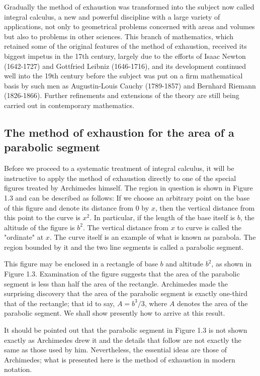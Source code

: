 \documentclass[cn,11pt,chinese]{elegantbook}
\numberwithin{equation}{section}
\begin{document}
Gradually the method of exhaustion was transformed into the subject now called integral calculus, a new and powerful discipline with a large variety of applications, not only to geometrical problems concerned with areas and volumes but also to problems in other sciences. This branch of mathematics, which retained some of the original features of the method of exhaustion, received its biggest impetus in the 17th century, largely due to the efforts of Isaac Newton (1642-1727) and Gottfried Leibniz (1646-1716), and its development continued well into the 19th century before the subject was put on a firm mathematical basis by such men as Augustin-Louis Cauchy (1789-1857) and Bernhard Riemann (1826-1866). Further refinements and extensions of the theory are still being carried out in contemporary mathematics.

\subsection{The method of exhaustion for the area of a parabolic segment}\label{section0010103}
Before we proceed to a systematic treatment of integral calculus, it will be instructive to apply the method of exhaustion directly to one of the special figures treated by Archimedes himself. The region in question is shown in Figure 1.3 and can be described as follows: If we choose an arbitrary point on the base of this figure and denote its distance from 0 by $x$, then the vertical distance from this point to the curve is $x^2$. In particular, if the length of the base itself is $b$, the altitude of the figure is $b^2$. The vertical distance from $x$ to curve is called the "ordinate" at $x$. The curve itself is an example of what is known as parabola. The region bounded by it and the two line segments is called a parabolic segment.

This figure may be enclosed in a rectangle of base $b$ and altitude $b^2$, as shown in Figure 1.3. Examination of the figure suggests that the area of the parabolic segment is less than half the area of the rectangle. Archimedes made the surprising discovery that the area of the parabolic segment is exactly one-third that of the rectangle; that id to say, $A = b^3/3$, where $A$ denotes the area of the parabolic segment. We shall show presently how to arrive at this result.

It should be pointed out that the parabolic segment in Figure 1.3 is not shown exactly as Archimedes drew it and the details that follow are not exactly the same as those used by him. Nevertheless, the essential ideas are those of Archimedes; what is presented here is the method of exhaustion in modern notation.
\end{document}
